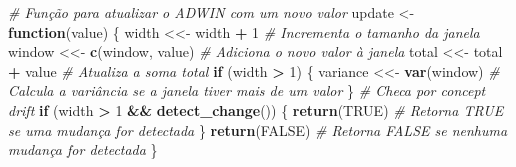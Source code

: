\documentclass[
]{article}
\newenvironment{Shaded}{\begin{snugshade}}{\end{snugshade}}
\newcommand{\CommentTok}[1]{\textcolor[rgb]{0.56,0.35,0.01}{\textit{#1}}}
\newcommand{\ConstantTok}[1]{\textcolor[rgb]{0.56,0.35,0.01}{#1}}
\newcommand{\ControlFlowTok}[1]{\textcolor[rgb]{0.13,0.29,0.53}{\textbf{#1}}}
\newcommand{\DecValTok}[1]{\textcolor[rgb]{0.00,0.00,0.81}{#1}}
\newcommand{\FunctionTok}[1]{\textcolor[rgb]{0.13,0.29,0.53}{\textbf{#1}}}
\newcommand{\NormalTok}[1]{#1}
\newcommand{\OtherTok}[1]{\textcolor[rgb]{0.56,0.35,0.01}{#1}}
\newcommand{\SpecialCharTok}[1]{\textcolor[rgb]{0.81,0.36,0.00}{\textbf{#1}}}
\begin{document}
\begin{Shaded}
\begin{Highlighting}[]
  \CommentTok{\# Função para atualizar o ADWIN com um novo valor}
\NormalTok{  update }\OtherTok{\textless{}{-}} \ControlFlowTok{function}\NormalTok{(value) \{}
\NormalTok{    width }\OtherTok{\textless{}\textless{}{-}}\NormalTok{ width }\SpecialCharTok{+} \DecValTok{1} \CommentTok{\# Incrementa o tamanho da janela}
\NormalTok{    window }\OtherTok{\textless{}\textless{}{-}} \FunctionTok{c}\NormalTok{(window, value) }\CommentTok{\# Adiciona o novo valor à janela}
\NormalTok{    total }\OtherTok{\textless{}\textless{}{-}}\NormalTok{ total }\SpecialCharTok{+}\NormalTok{ value }\CommentTok{\# Atualiza a soma total}
    \ControlFlowTok{if}\NormalTok{ (width }\SpecialCharTok{\textgreater{}} \DecValTok{1}\NormalTok{) \{}
\NormalTok{      variance }\OtherTok{\textless{}\textless{}{-}} \FunctionTok{var}\NormalTok{(window) }\CommentTok{\# Calcula a variância se a janela tiver mais de um valor}
\NormalTok{    \}}
    \CommentTok{\# Checa por concept drift}
    \ControlFlowTok{if}\NormalTok{ (width }\SpecialCharTok{\textgreater{}} \DecValTok{1} \SpecialCharTok{\&\&} \FunctionTok{detect\_change}\NormalTok{()) \{}
      \FunctionTok{return}\NormalTok{(}\ConstantTok{TRUE}\NormalTok{) }\CommentTok{\# Retorna TRUE se uma mudança for detectada}
\NormalTok{    \}}
    \FunctionTok{return}\NormalTok{(}\ConstantTok{FALSE}\NormalTok{) }\CommentTok{\# Retorna FALSE se nenhuma mudança for detectada}
\NormalTok{  \}}
  

\end{Highlighting}
\end{Shaded}
\end{document}
